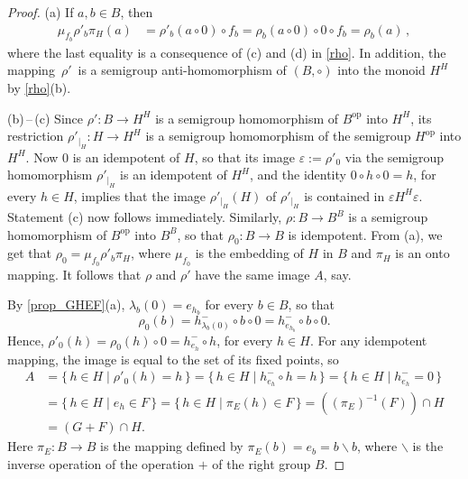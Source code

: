\documentclass[11pt]{amsart}
\DeclareMathOperator{\op}{op}
\theoremstyle{definition}
\begin{document}
    \begin{proof}
    (a) 
    If $a,b \in B$, then
    \begin{align*}
        \mu_{f_b}\rho'_b\pi_H(a) &=
        \rho'_b(a \circ 0) \circ f_b =
        \rho_b(a \circ 0) \circ 0 \circ f_b =
        \rho_b(a) \,,
    \end{align*}
    where the last equality is a consequence of (c) and (d) in \cref{rho}.
      In addition, the mapping\, 
      $\rho'$\, %
      is a semigroup anti-homomorphism of $(B,\circ)$ into the monoid $H^H$ by \cref{rho}(b).
 
    (b)\,--\,(c) Since $\rho'\colon B\to H^H$ is a semigroup homomorphism of $B^{\op}$ into $H^H$, its restriction $\rho'_{|_H}\colon H\to H^H$ is a semigroup homomorphism of the semigroup $H^{\op}$ into $H^H$. Now $0$ is an idempotent of $H$, so that its image $\varepsilon:=\rho'_0$ via the semigroup homomorphism $\rho'_{|_H}$ is an idempotent of $H^H$, and the identity $0\circ h\circ 0=h$, for every $h\in H$, implies that the image $\rho'_{|_H}(H)$ of $\rho'_{|_H}$ is contained in $\varepsilon H^H\varepsilon$. Statement (c) now follows immediately. Similarly, $\rho\colon B\to B^B$ is a semigroup homomorphism of $B^{\op}$ into $B^B$, so that $\rho_0\colon B\to B$ is idempotent. From (a), we get that $\rho_0=\mu_{f_0} \rho'_b\pi_H$, where $\mu_{f_0} $ is the embedding of $H$ in $B$ and $\pi_H$ is an onto mapping. It follows that $\rho$ and $\rho'$ have the same image $A$, say.
    
  By \cref{prop_GHEF}(a), $\lambda_b(0)=e_{h_b}$ for every $b\in B$, so that $$\rho_0(b)
        = h_{\lambda_b(0)}^-\circ b \circ 0=h_{e_{h_b}}^-\circ b \circ 0.$$ Hence, $\rho'_0(h)=\rho_0(h) \circ 0=h_{e_{h}}^-\circ h$, for every $h\in H$.%
        For any idempotent mapping, the image is equal to the set of its fixed points, so 
        \begin{align*}
            A&=\{\,h\in H\mid \rho'_0(h)=h\,\}=\{\,h\in H\mid h_{e_{h}}^-\circ h=h\,\}=\{\,h\in H\mid h_{e_{h}}^-=0\,\}\\
            &=\{\,h\in H\mid e_h\in F\,\}=\{\,h\in H\mid \pi_E(h)\in F\,\}=
       \left( (\pi_E)^{-1}(F )\right)\cap H\\
       &=(G+F)\cap H.
        \end{align*} Here $\pi_E\colon B\to B$ is the mapping defined by $\pi_E(b)=e_b=b\backslash b$, where $\backslash$ is the inverse operation of the operation $+$ of the right group $B.$
       

\end{proof}
\end{document}
